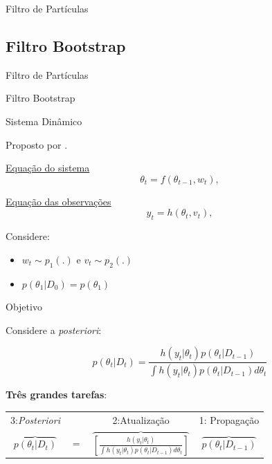 \documentclass{beamer}
\begin{document}
\begin{frame}{}
    \begin{block}{}
      \Huge  Filtro de Partículas
    \end{block}
\end{frame}

\subsection{Filtro Bootstrap}

\begin{frame}{Filtro de Partículas}
    \begin{block}{}
      \Huge  Filtro Bootstrap
    \end{block}
\end{frame}

\begin{frame}{Sistema Dinâmico}

Proposto por \cite{gordon}.

\vspace{0.5cm}

\underline{Equação do sistema}
$$\theta_t = f(\theta_{t-1},w_t),$$

\pause

\underline{Equação das observações}
$$y_t = h(\theta_{t} , v_t),$$

\pause

Considere:
\begin{itemize}
\item $w_t \sim p_1(.)$ e $v_t\sim p_2(.)$
\item $p(\theta_1|D_0)=p(\theta_1)$
\end{itemize}

\end{frame}


\begin{frame}{Objetivo}

Considere a \textit{posteriori}:

\vspace{0.5cm}

$$
p(\theta_t|D_t)  = \frac{h(y_t|\theta_t)  p(\theta_t|D_{t-1}) }{\int h(y_t|\theta_t)p(\theta_t|D_{t-1})d \theta_t}
$$

\pause

\textbf{Três grandes tarefas}:
\vspace{0.5cm}

\begin{tabular}{cccc}
3:\textit{Posteriori} & & 2:Atualização & 1: Propagação \\
$\overbrace{p(\theta_t|D_t)} $ & $=$ & $\overbrace{\left[\frac{h(y_t|\theta_t)}{\int h(y_t|\theta_t)p(\theta_t|D_{t-1})d \theta_t}\right]} $& $\overbrace{p(\theta_t|D_{t-1})}$
\end{tabular}

\end{frame}
\end{document}
